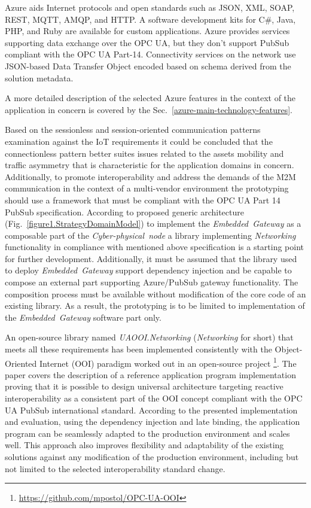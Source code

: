 \documentclass[runningheads]{llncs}
\begin{document}
Azure aids Internet protocols and open standards such as JSON, XML, SOAP, REST, MQTT\cite{RefWorks:doc:5d91e158e4b02eb43d36bb97}, AMQP\cite{RefWorks:doc:5d91d2d9e4b0bc72a68ffe06}, and HTTP. A software development kits for C\#, Java, PHP, and Ruby are available for custom applications. Azure provides services supporting data exchange over the OPC UA, but they don't support PubSub compliant with the OPC UA Part-14. Connectivity services on the network use JSON-based Data Transfer Object encoded based on schema derived from the solution metadata.

A more detailed description of the selected Azure features in the context of the application in concern is covered by the Sec.~\ref{azure-main-technology-features}.

Based on the sessionless and session-oriented communication patterns examination against the IoT requirements \cite{mpostol2020} it could be concluded that the connectionless pattern better suites issues related to the assets mobility and traffic asymmetry that is characteristic for the application domains in concern. Additionally, to promote interoperability and address the demands of the M2M communication in the context of a multi-vendor environment the prototyping should use a framework that must be compliant with the OPC UA Part 14 PubSub  specification. According to proposed generic architecture (Fig.~\ref{figure1.StrategyDomainModel}) to implement the \emph{Embedded\ Gateway} as a composable part of the \emph{Cyber-physical\ node} a library implementing \emph{Networking} functionality in compliance with mentioned above specification is a starting point for further development. Additionally, it must be assumed that the library used to deploy \emph{Embedded\ Gateway} support dependency injection and be capable to compose an external part supporting Azure/PubSub gateway functionality. The composition process must be available without modification of the core code of an existing library. As a result, the prototyping is to be limited to implementation of the \emph{Embedded\ Gateway} software part only.

An open-source library named \emph{UAOOI.Networking} (\emph{Networking} for short) that meets all these requirements has been implemented consistently with the Object-Oriented Internet (OOI) paradigm \cite{mariusz_postol_2020_4361640} worked out in an open-source project \footnote{ \url{https://github.com/mpostol/OPC-UA-OOI} }. The paper \cite{mpostol2020} covers the description of a reference application program implementation proving that it is possible to design universal architecture targeting reactive interoperability as a consistent part of the OOI concept compliant with the OPC UA PubSub international standard. According to the presented implementation and evaluation, using the dependency injection and late binding, the application program can be seamlessly adapted to the production environment and scales well. This approach also improves flexibility and adaptability of the existing solutions against any modification of the production environment, including but not limited to the selected interoperability standard change.
\end{document}
